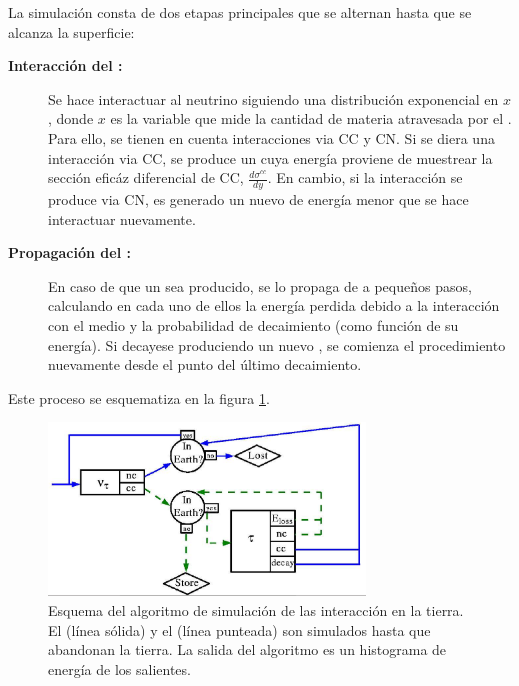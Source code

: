 		La simulaci\'on consta de dos etapas principales que se alternan hasta que se alcanza la superficie:
		\begin{description}
		\item[\textbf{Interacci\'on del \nutau{}:}] Se hace interactuar al neutrino siguiendo una distribuci\'on exponencial en $x$, donde $x$ es la variable que mide la cantidad de materia atravesada por el \nutau{}. Para ello, se tienen en cuenta interacciones via CC y CN. Si se diera una interacci\'on via CC, se produce un \tauon{} cuya energ\'ia proviene de muestrear la sección efic\'az diferencial de CC, $\frac{d\sigma^{cc}}{dy}$. En cambio, si la interacci\'on se produce via CN, es generado un nuevo \nutau{} de energ\'ia menor que se hace interactuar nuevamente.
		\item[\textbf{Propagaci\'on del \tauon{}:}] En caso de que un \tauon{} sea producido, se lo propaga de a peque\~nos pasos, calculando en cada uno de ellos la energ\'ia perdida debido a la interacci\'on con el medio y la probabilidad de decaimiento (como funci\'on de su energ\'ia). Si decayese produciendo un nuevo \nutau{}, se comienza el procedimiento nuevamente desde el punto del \'ultimo decaimiento.
		\end{description}
		Este proceso se esquematiza en la figura \ref{fig:tau_sim_sch}.
		\begin{figure}[ht!]
			\begin{center}
			\includegraphics[width=0.75\textwidth]{fig/simulacionAuger/schemeEarthProp}
			\caption{\label{fig:tau_sim_sch} Esquema del algoritmo de simulación de las interacción en la tierra. El \nutau{} (línea sólida) y el \tauon{} (línea punteada) son simulados hasta que abandonan la tierra. La salida del algoritmo es un histograma de energía de los \tauon{} salientes.}
			\end{center}
		\end{figure}
		
